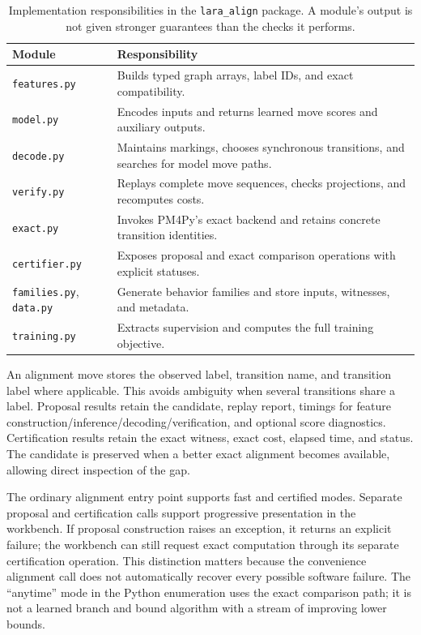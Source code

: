 \begin{table}[!t]
\caption{Implementation responsibilities in the \texttt{lara\_align} package. A module's output is not given stronger guarantees than the checks it performs.}
\label{tab:modules}
\centering
\begin{tabularx}{\linewidth}{@{}lY@{}}
\toprule
Module & Responsibility\\
\midrule
\texttt{features.py} & Builds typed graph arrays, label IDs, and exact compatibility.\\
\texttt{model.py} & Encodes inputs and returns learned move scores and auxiliary outputs.\\
\texttt{decode.py} & Maintains markings, chooses synchronous transitions, and searches for model move paths.\\
\texttt{verify.py} & Replays complete move sequences, checks projections, and recomputes costs.\\
\texttt{exact.py} & Invokes PM4Py's exact backend and retains concrete transition identities.\\
\texttt{certifier.py} & Exposes proposal and exact comparison operations with explicit statuses.\\
\texttt{families.py}, \texttt{data.py} & Generate behavior families and store inputs, witnesses, and metadata.\\
\texttt{training.py} & Extracts supervision and computes the full training objective.\\
\bottomrule
\end{tabularx}
\end{table}

An alignment move stores the observed label, transition name, and transition label where applicable. This avoids ambiguity when several transitions share a label. Proposal results retain the candidate, replay report, timings for feature construction/inference/decoding/verification, and optional score diagnostics. Certification results retain the exact witness, exact cost, elapsed time, and status. The candidate is preserved when a better exact alignment becomes available, allowing direct inspection of the gap.

The ordinary alignment entry point supports fast and certified modes. Separate proposal and certification calls support progressive presentation in the workbench. If proposal construction raises an exception, it returns an explicit failure; the workbench can still request exact computation through its separate certification operation. This distinction matters because the convenience alignment call does not automatically recover every possible software failure. The ``anytime'' mode in the Python enumeration uses the exact comparison path; it is not a learned branch and bound algorithm with a stream of improving lower bounds.

